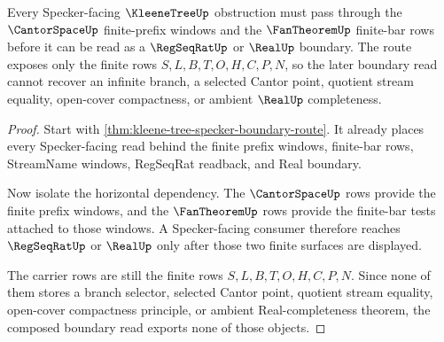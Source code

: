 \begin{theorem}
\label{thm:kleene-tree-cantor-space-fan-boundary}
Every Specker-facing $\KleeneTreeUp$ obstruction must pass through the $\CantorSpaceUp$ finite-prefix windows and the $\FanTheoremUp$ finite-bar rows before it can be read as a $\RegSeqRatUp$ or $\RealUp$ boundary. The route exposes only the finite rows $S,L,B,T,O,H,C,P,N$, so the later boundary read cannot recover an infinite branch, a selected Cantor point, quotient stream equality, open-cover compactness, or ambient $\RealUp$ completeness.
\end{theorem}
\begin{proof}
Start with \autoref{thm:kleene-tree-specker-boundary-route}. It already places every Specker-facing read behind the finite prefix windows, finite-bar rows, StreamName windows, RegSeqRat readback, and Real boundary.

Now isolate the horizontal dependency. The $\CantorSpaceUp$ rows provide the finite prefix windows, and the $\FanTheoremUp$ rows provide the finite-bar tests attached to those windows. A Specker-facing consumer therefore reaches $\RegSeqRatUp$ or $\RealUp$ only after those two finite surfaces are displayed.

The carrier rows are still the finite rows $S,L,B,T,O,H,C,P,N$. Since none of them stores a branch selector, selected Cantor point, quotient stream equality, open-cover compactness principle, or ambient Real-completeness theorem, the composed boundary read exports none of those objects.
\end{proof}

